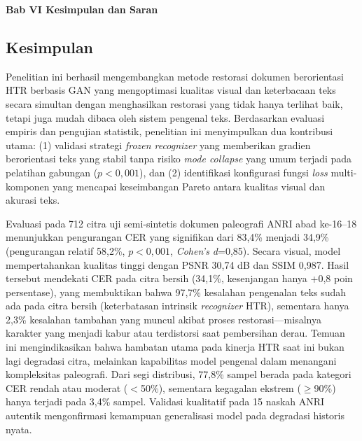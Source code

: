 \documentclass[12pt,a4paper]{article}
\begin{document}
\vspace{2cm}
\begin{center}
  {\fontsize{14}{16.8}\selectfont\textbf{Bab VI \quad Kesimpulan dan Saran}}
\end{center}
\label{sec:kesimpulan-dan-saran}
\setcounter{section}{6}
\setcounter{subsection}{0}
\setcounter{table}{0}
\setcounter{figure}{0}
\subsection{Kesimpulan}
\label{subsec:kesimpulan}


Penelitian ini berhasil mengembangkan metode restorasi dokumen berorientasi HTR berbasis GAN yang mengoptimasi kualitas visual dan keterbacaan teks secara simultan dengan menghasilkan restorasi yang tidak hanya terlihat baik, tetapi juga mudah dibaca oleh sistem pengenal teks. Berdasarkan evaluasi empiris dan pengujian statistik, penelitian ini menyimpulkan dua kontribusi utama: (1) validasi strategi \textit{frozen recognizer} yang memberikan gradien berorientasi teks yang stabil tanpa risiko \textit{mode collapse} yang umum terjadi pada pelatihan gabungan ($p<0,001$), dan (2) identifikasi konfigurasi fungsi \textit{loss} multi-komponen yang mencapai keseimbangan Pareto antara kualitas visual dan akurasi teks.



Evaluasi pada 712 citra uji semi-sintetis dokumen paleografi ANRI abad ke-16--18 menunjukkan pengurangan CER yang signifikan dari 83,4\% menjadi 34,9\% (pengurangan relatif 58,2\%, $p<0,001$, \textit{Cohen's d}=0,85). Secara visual, model mempertahankan kualitas tinggi dengan PSNR 30,74 dB dan SSIM 0,987. Hasil tersebut mendekati CER pada citra bersih (34,1\%, kesenjangan hanya +0,8 poin persentase), yang membuktikan bahwa 97,7\% kesalahan pengenalan teks sudah ada pada citra bersih (keterbatasan intrinsik \textit{recognizer} HTR), sementara hanya 2,3\% kesalahan tambahan yang muncul akibat proses restorasi---misalnya karakter yang menjadi kabur atau terdistorsi saat pembersihan derau. Temuan ini mengindikasikan bahwa hambatan utama pada kinerja HTR saat ini bukan lagi degradasi citra, melainkan kapabilitas model pengenal dalam menangani kompleksitas paleografi. Dari segi distribusi, 77,8\% sampel berada pada kategori CER rendah atau moderat ($<$50\%), sementara kegagalan ekstrem ($\geq$90\%) hanya terjadi pada 3,4\% sampel. Validasi kualitatif pada 15 naskah ANRI autentik mengonfirmasi kemampuan generalisasi model pada degradasi historis nyata.
\end{document}
